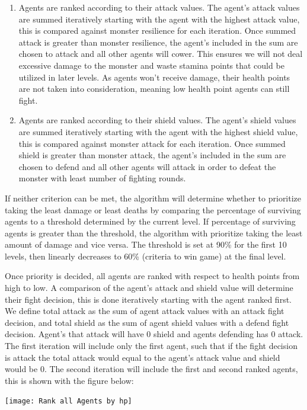 \begin{enumerate}
\item  Agents are ranked according to their attack values. The agent's attack values are summed iteratively starting with the agent with the highest attack value, this is compared against monster resilience for each iteration. Once summed attack is greater than monster resilience, the agent's included in the sum are chosen to attack and all other agents will cower. This ensures we will not deal excessive damage to the monster and waste stamina points that could be utilized in later levels. As agents won't receive damage, their health points are not taken into consideration, meaning low health point agents can still fight.

\noindent 

\item  Agents are ranked according to their shield values. The agent's shield values are summed iteratively starting with the agent with the highest shield value, this is compared against monster attack for each iteration. Once summed shield is greater than monster attack, the agent's included in the sum are chosen to defend and all other agents will attack in order to defeat the monster with least number of fighting rounds.
\end{enumerate}

\noindent 

\noindent If neither criterion can be met, the algorithm will determine whether to prioritize taking the least damage or least deaths by comparing the percentage of surviving agents to a threshold determined by the current level. If percentage of surviving agents is greater than the threshold, the algorithm with prioritize taking the least amount of damage and vice versa. The threshold is set at 90\% for the first 10 levels, then linearly decreases to 60\% (criteria to win game) at the final level.

\noindent 

\noindent Once priority is decided, all agents are ranked with respect to health points from high to low. A comparison of the agent's attack and shield value will determine their fight decision, this is done iteratively starting with the agent ranked first. We define total attack as the sum of agent attack values with an attack fight decision, and total shield as the sum of agent shield values with a defend fight decision. Agent's that attack will have 0 shield and agents defending has 0 attack. The first iteration will include only the first agent, such that if the fight decision is attack the total attack would equal to the agent's attack value and shield would be 0. The second iteration will include the first and second ranked agents, this is shown with the figure below:
\begin{center}
    \texttt{[image: Rank all Agents by hp]}
\end{center}


